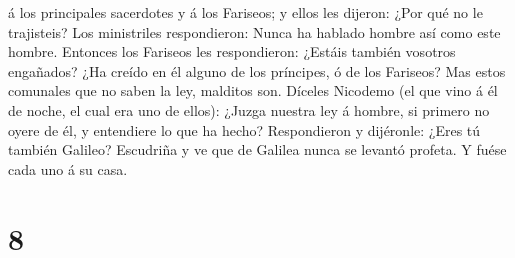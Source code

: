 á los principales sacerdotes y á los Fariseos; y ellos les dijeron: ¿Por
qué no le trajisteis?  Los ministriles respondieron:
Nunca ha hablado hombre así como este hombre.  Entonces
los Fariseos les respondieron: ¿Estáis también vosotros engañados?
 ¿Ha creído en él alguno de los príncipes, ó de los
Fariseos?  Mas estos comunales que no saben la ley,
malditos son.  Díceles Nicodemo (el que vino á él de
noche, el cual era uno de ellos):  ¿Juzga nuestra ley á
hombre, si primero no oyere de él, y entendiere lo que ha hecho?
 Respondieron y dijéronle: ¿Eres tú también Galileo?
Escudriña y ve que de Galilea nunca se levantó profeta. 
Y fuése cada uno á su casa.

\hypertarget{section-7}{%
\section{8}\label{section-7}}

